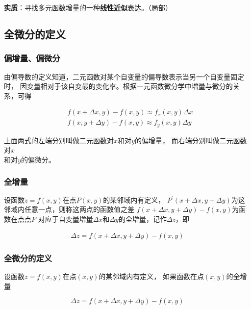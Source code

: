 \documentclass[12pt, a4paper]{article}
\numberwithin{equation}{section}
\begin{document}
    \textbf{实质}：寻找多元函数增量的一种\textbf{线性近似}表达。（局部）

\subsection{全微分的定义}

\subsubsection{偏增量、偏微分}

    由偏导数的定义知道，二元函数对某个自变量的偏导数表示当另一个自变量固定时，
    因变量相对于该自变最的变化率。根据一元函数微分学中增量与微分的关系，可得

    $$
        \begin{aligned}
            & f(x+\Delta x, y)-f(x, y) \approx f_x(x, y) \Delta x \\
            & f(x, y+\Delta y)-f(x, y) \approx f_y(x, y) \Delta y
        \end{aligned}
    $$

    上面两式的左端分别叫做二元函数对\(x\)和对\(y\)的偏增量，
    而右端分别叫做二元函数对\(x\)\\和对\(y\)的偏微分。

\subsubsection{全增量}

    设函数\(z=f\left(x,y\right)\)在点\(P\left(x, y\right)\)的某邻域内有定义，
    \(P^{\prime}\left(x+\Delta x,y+\Delta y\right)\)为这邻域内任意一点，则称这两点的函数值之差
    \(f\left(x+\Delta x,y+\Delta y\right)-f\left(x,y\right)\)为函数在点点\(P\)
    对应于自变量增量\(\Delta x\)和\(\Delta y\)的全增量，记作\(\Delta z\)，即

    \begin{align}
        \Delta z=f(x+\Delta x, y+\Delta y)-f(x, y)
    \end{align}

\subsubsection{全微分的定义}

    设函数\(z=f\left(x,y\right)\)在点\(\left(x, y\right)\)的某邻域内有定义，
    如果函数在点\(\left(x, y\right)\)的全增量

    $$
        \Delta z=f(x+\Delta x, y+\Delta y)-f(x, y)
    $$
\end{document}
